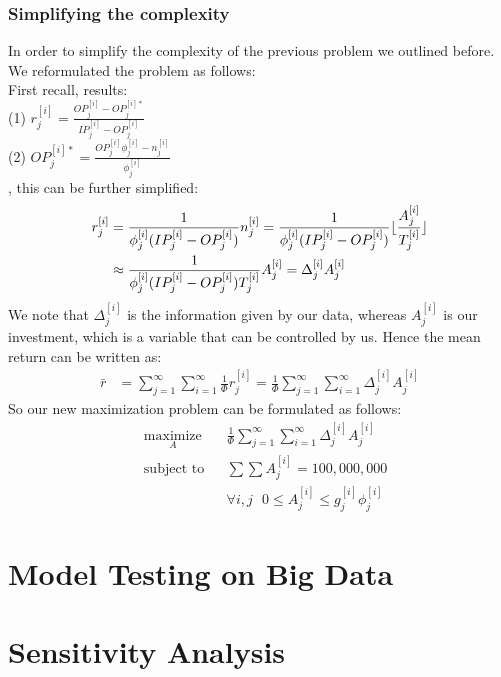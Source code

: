 \documentclass[12pt]{article}
\DeclarePairedDelimiter\floor{\lfloor}{\rfloor}
\begin{document}
	\subsubsection{Simplifying the complexity}
		In order to simplify the complexity of the previous problem we outlined before. We reformulated the problem as follows:\\
		First recall, results:\\
		(1) $r_j^{[i]} = \frac{ OP_j^{[i]} - OP_j^{[i]*}  }{ IP_j^{[i]} - 
		OP_j^{[i]}  }$\\
		(2) $OP_j^{[i]*} = \frac{  OP_j^{[i]}\phi_j^{[i]}-n_j^{[i]}  }{ \phi_j^{[i]}  }$\\
		, this can be further simplified:
		\begin{align*}
			r_j^{[i]} &= \frac{1 }{ \phi_j^{[i]} (IP_j^{[i]} - OP_j^{[i]} ) } n_j^{[i]} = \frac{1 }{ \phi_j^{[i]} (IP_j^{[i]} - OP_j^{[i]} ) }\floor{\frac{A_j^{[i]}}{T_j^{[i]}}} \\
				&\approx \frac{1}{ 
					\phi_j^{[i]} 
						(IP_j^{[i]} - OP_j^{[i]}) T_j^{[i]} 
					} A_j^{[i]} 
				= \Delta_j^{[i]}A_j^{[i]}
		\end{align*}	
		We note that $\Delta_j^{[i]}$ is the information given by our data, whereas $A_j^{[i]}$ is our investment, which is a variable that can be controlled by us.
		Hence the mean return can be written as:
		\begin{align*}
			\bar{r} &= \sum_{j=1}^\infty\sum_{i=1}^\infty \frac{ 1  }{ \Phi } r_j^{[i]} = \frac{ 1  }{ \Phi }\sum_{j=1}^\infty\sum_{i=1}^\infty \Delta_j^{[i]}A_j^{[i]}
		\end{align*}
		So our new maximization problem can be formulated as follows:
		\begin{equation*}
				\begin{aligned}
					& \underset{A}{\text{maximize}}
					& &\frac{ 1  }{ \Phi }\sum_{j=1}^\infty\sum_{i=1}^\infty \Delta_j^{[i]}A_j^{[i]}\\
					& \text{subject to}
					& & \sum \sum A_j^{[i]} = 100,000,000\\
					&&& \forall i,j \ \ \ 0\le A_j^{[i]} \le g_j^{[i]}\phi_j^{[i]}
				\end{aligned}	
		\end{equation*}
		
\section{Model Testing on Big Data} 

\section{Sensitivity Analysis} 
\end{document}
